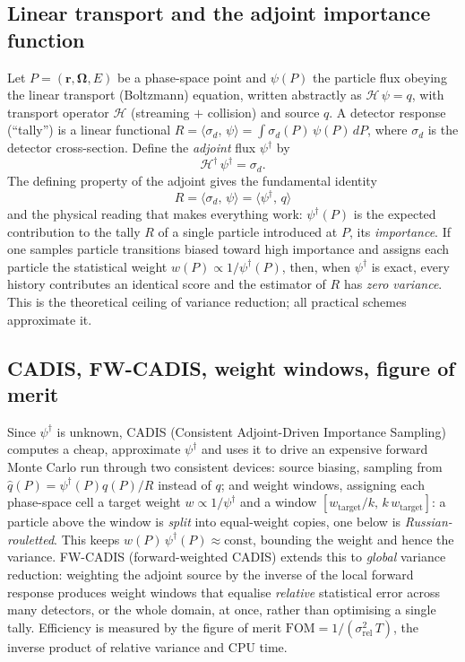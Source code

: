 \documentclass[11pt]{article}
\newcommand{\dg}{^{\dagger}}
\newcommand{\ip}[2]{\langle #1,\,#2\rangle}
\begin{document}
	\subsection{Linear transport and the adjoint importance function}
	Let $P=(\mathbf r,\mathbf\Omega,E)$ be a phase-space point and $\psi(P)$ the particle flux
	obeying the linear transport (Boltzmann) equation, written abstractly as $\mathcal H\,\psi
	= q$, with transport operator $\mathcal H$ (streaming $+$ collision) and source $q$. A
	detector response (``tally'') is a linear functional $R=\ip{\sigma_d}{\psi}=\int
	\sigma_d(P)\,\psi(P)\,dP$, where $\sigma_d$ is the detector cross-section. Define the
	\emph{adjoint} flux $\psi\dg$ by
	\begin{equation}
		\mathcal H\dg\,\psi\dg=\sigma_d .
		\label{eq:adjoint}
	\end{equation}
	The defining property of the adjoint gives the fundamental identity
	\begin{equation}
		\boxed{\;R=\ip{\sigma_d}{\psi}=\ip{\psi\dg}{q}\;}
		\label{eq:fund}
	\end{equation}
	and the physical reading that makes everything work: $\psi\dg(P)$ is the expected
	contribution to the tally $R$ of a single particle introduced at $P$, its
	\emph{importance}. If one samples particle transitions biased toward high importance and
	assigns each particle the statistical weight $w(P)\propto 1/\psi\dg(P)$, then, when
	$\psi\dg$ is exact, every history contributes an identical score and the estimator of $R$
	has \emph{zero variance}. This is the theoretical ceiling of variance reduction; all
	practical schemes approximate it.
	
	\subsection{CADIS, FW-CADIS, weight windows, figure of merit}
	Since $\psi\dg$ is unknown, CADIS (Consistent Adjoint-Driven Importance Sampling) computes
	a cheap, approximate $\psi\dg$ and uses it to drive an expensive forward Monte Carlo run
	through two consistent devices: source biasing, sampling from
	$\hat q(P)=\psi\dg(P)q(P)/R$ instead of $q$; and weight windows, assigning each
	phase-space cell a target weight $w\propto 1/\psi\dg$ and a window
	$[w_{\text{target}}/k,\,k\,w_{\text{target}}]$: a particle above the window is
	\emph{split} into equal-weight copies, one below is \emph{Russian-rouletted}. This keeps
	$w(P)\,\psi\dg(P)\approx\text{const}$, bounding the weight and hence the variance.
	FW-CADIS (forward-weighted CADIS) extends this to \emph{global} variance
	reduction: weighting the adjoint source by the inverse of the local forward response
	produces weight windows that equalise \emph{relative} statistical error across many
	detectors, or the whole domain, at once, rather than optimising a single tally. Efficiency
	is measured by the figure of merit $\mathrm{FOM}=1/(\sigma_{\mathrm{rel}}^2\,T)$, the
	inverse product of relative variance and CPU time.
	
\end{document}
